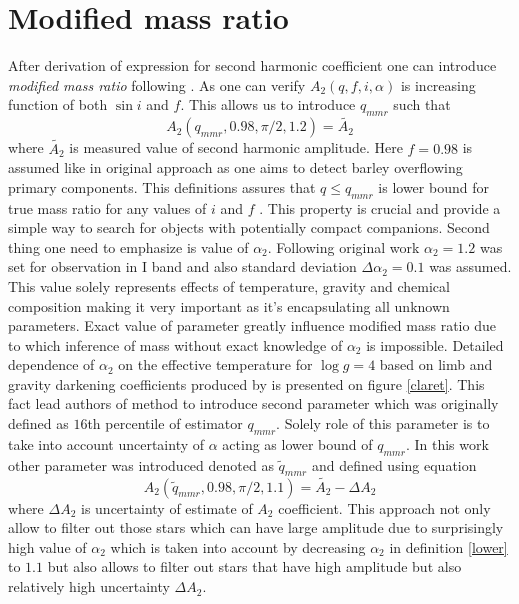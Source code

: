 \documentclass{pracalicmgr}
\begin{document}
\section{Modified mass ratio}
\hspace{1cm} After derivation of expression for second harmonic coefficient one can introduce {\it modified mass ratio} following \citet{gomel_search_2021-1}. 
As one can verify $A_2(q,f,i,\alpha)$ is increasing 
function of both $\sin{i}$ and $f$. This allows us to introduce $q_{mmr}$ such that
\begin{equation}\label{qmmr}
    A_2(q_{mmr},0.98,\pi/2,1.2)=\tilde{A_2}
\end{equation}
where $\tilde{A_2}$ is measured value of second harmonic amplitude.
Here $f=0.98$ is assumed like in original approach as one aims to detect barley overflowing primary components.
This definitions assures that $q\leq q_{mmr}$ is lower bound for true mass ratio for any values of $i$ and $f$  . 
This property is crucial and provide a simple way to search for objects with potentially compact companions. Second thing 
one need to emphasize is value of $\alpha_2$. Following original work $\alpha_2=1.2$ was set for observation in I band and also standard deviation $\Delta\alpha_2=0.1$
was assumed. This value
solely represents effects of temperature, gravity and chemical composition making it very important as it's encapsulating all unknown parameters. 
Exact value of parameter greatly influence modified mass ratio due to which inference of mass without exact knowledge of $\alpha_2$ is impossible.
Detailed dependence of $\alpha_2$ on the effective temperature for $\log g=4$ based on limb and gravity darkening coefficients produced by 
\citet{claret_new_2000} is presented on figure \ref{claret}.
This fact lead authors of method to introduce second parameter which was originally defined as $16$th percentile of estimator $q_{mmr}$. Solely role of this 
parameter is to take into account uncertainty of $\alpha$ acting as lower bound of $q_{mmr}$. In this work other parameter was introduced denoted as $\tilde{q}_{mmr}$ and defined 
using equation
\begin{equation*}\label{lower}
    A_2(\tilde{q}_{mmr},0.98,\pi/2,1.1)=\tilde{A_2}-\Delta A_2
\end{equation*}
where $\Delta A_2$ is uncertainty of estimate of $A_2$ coefficient. This approach not only allow to filter out those stars which can have large amplitude due to 
surprisingly high value of $\alpha_2$ which is taken into account by decreasing $\alpha_2$ in definition \ref{lower} to $1.1$ but also allows to filter out stars
that have high amplitude but also relatively high uncertainty $\Delta A_2$.
\end{document}
